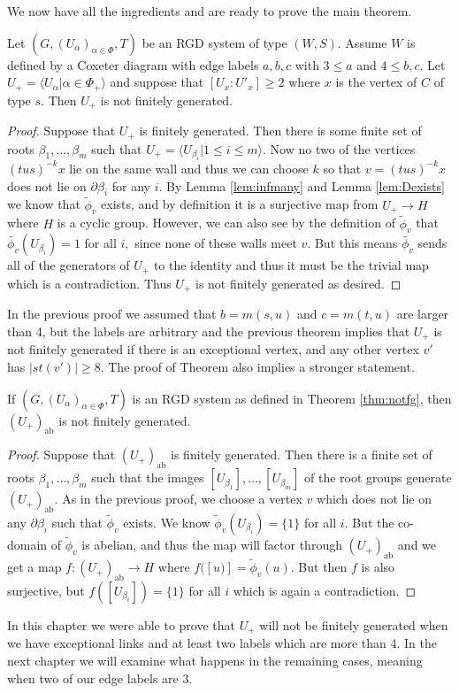 \documentclass[class=book, crop=false,12 pt]{standalone}
\begin{document}
We now have all the ingredients and are ready to prove the main theorem.

\begin{theorem}
	\label{thm:notfg}
	Let $(G,(U_\alpha)_{\alpha\in \Phi},T)$ be an RGD system of type $(W,S).$ Assume $W$ is defined by a Coxeter diagram with edge labels $a,b,c$ with $3\le a$ and $4\le b,c.$ Let $U_+=\langle U_\alpha|\alpha\in \Phi_+\rangle$ and suppose that $[U_x:U'_x]\ge 2$ where $x$ is the vertex of $C$ of type $s.$ Then $U_+$ is not finitely generated.
\end{theorem}
\begin{proof}
	Suppose that $U_+$ is finitely generated. Then there is some finite set of roots $\beta_1,\dots,\beta_m$ such that $U_+=\langle U_{\beta_i}|1\le i\le m\rangle.$ Now no two of the vertices $(tus)^{-k}x$ lie on the same wall and thus we can choose $k$ so that $v=(tus)^{-k}x$ does not lie on $\partial \beta_i$ for any $i.$ By Lemma \ref{lem:infmany} and Lemma \ref{lem:Dexists} we know that $\tilde{\phi}_v$ exists, and by definition it is a surjective map from $U_+\to H$ where $H$ is a cyclic group. However, we can also see by the definition  of $\tilde{\phi}_v$ that $\tilde{\phi_v}(U_{\beta_i})=1$ for all $i,$ since none of these walls meet $v.$ But this means $\tilde{\phi_v}$ sends all of the generators of $U_+$ to the identity and thus it must be the trivial map which is a contradiction. Thus $U_+$ is not finitely generated as desired.
\end{proof}

In the previous proof we assumed that $b=m(s,u)$ and $c=m(t,u)$ are larger than 4, but the labels are arbitrary and the previous theorem implies that $U_+$ is not finitely generated if there is an exceptional vertex, and any other vertex $v'$ has $|st(v')|\ge 8.$ The proof of Theorem \label{thm:notfg} also implies a stronger statement.

\begin{cor}
	\label{cor:abnotfg}
	If $(G,(U_\alpha)_{\alpha\in \Phi},T)$ is an RGD system as defined in Theorem \ref{thm:notfg}, then $(U_+)_\text{ab}$ is not finitely generated.
\end{cor}
\begin{proof}
	Suppose that $(U_+)_\text{ab}$ is finitely generated. Then there is a finite set of roots $\beta_1,\dots,\beta_m$ such that the images $[U_{\beta_1}],\dots,[U_{\beta_m}]$ of the root groups generate $(U_+)_\text{ab}.$ As in the previous proof, we choose a vertex $v$ which does not lie on any $\partial \beta_i$ such that $\tilde{\phi}_v$ exists. We know $\tilde{\phi}_v(U_{\beta_i})=\{1\}$ for all $i.$ But the co-domain of $\tilde{\phi}_v$ is abelian, and thus the map will factor through $(U_+)_\text{ab}$ and we get a map $f:(U_+)_\text{ab}\to H$ where $f([u)]=\tilde{\phi}_v(u).$ But then $f$ is also surjective, but $f([U_{\beta_i}])=\{1\}$ for all $i$ which is again a contradiction.
\end{proof}

In this chapter we were able to prove that $U_+$ will not be finitely generated when we have exceptional links and at least two labels which are more than 4. In the next chapter we will examine what happens in the remaining cases, meaning when two of our edge labels are 3.
\end{document}
